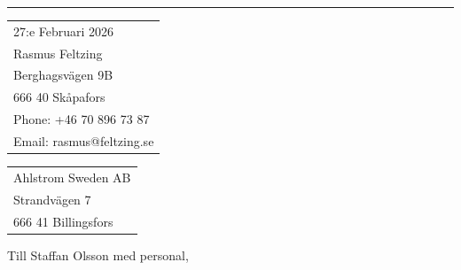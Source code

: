 \documentclass{article}
\begin{document}


\vspace{-1em} %

\rule{\linewidth}{1pt} %

\bigskip\bigskip %


\hfill
\begin{tabular}{l @{}}
	27:e Februari 2026 \bigskip\\ %
	Rasmus Feltzing \\
	Berghagsvägen 9B \\ %
	666 40 Skåpafors \\
	Phone: +46 70 896 73 87 \\
	Email: rasmus@feltzing.se
\end{tabular}

\bigskip %


\begin{tabular}{@{} l}
	Ahlstrom Sweden AB\\
	Strandvägen 7\\
	666 41 Billingsfors
\end{tabular}

\bigskip %

Till Staffan Olsson med personal,

\bigskip %


\end{document}

